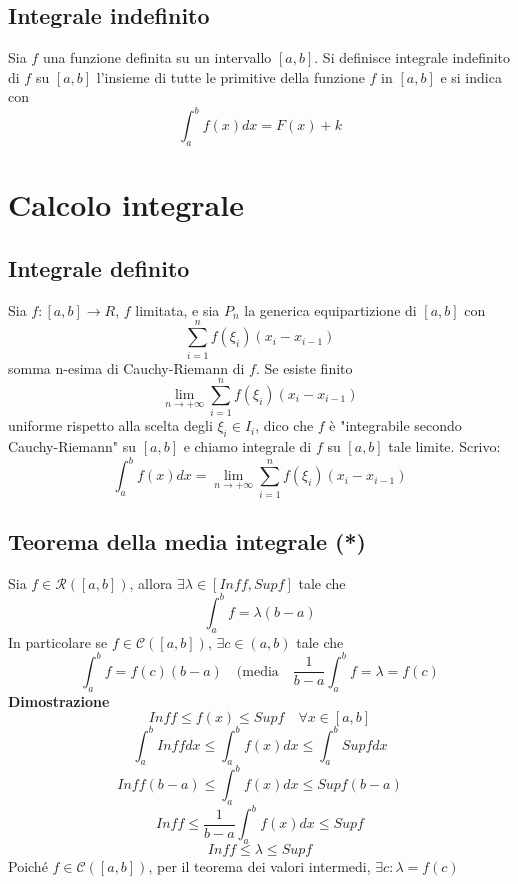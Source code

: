 \documentclass[12pt]{article}
\begin{document}
\subsection{Integrale indefinito}
Sia $f$ una funzione definita su un intervallo $[a,b]$. Si definisce integrale indefinito di $f$ su $[a,b]$ l'insieme di tutte le primitive della funzione $f$ in $[a,b]$ e si indica con 
\[\int_a^b f(x)dx = F(x) + k\]

\section{Calcolo integrale}

\subsection{Integrale definito}
Sia $f:[a,b] \to R$, $f$ limitata, e sia $P_n$ la generica equipartizione di $[a,b]$ con 
\[ \sum_{i = 1}^{n}f(\xi_i)(x_i-x_{i-1})\]
somma n-esima di Cauchy-Riemann di $f$. Se esiste finito \[ \lim_{n \to +\infty} \sum_{i = 1}^{n}f(\xi_i)(x_i-x_{i-1})\]
uniforme rispetto alla scelta degli $\xi_i \in I_i$, dico che $f$ è "integrabile secondo Cauchy-Riemann" su $[a,b]$ e chiamo integrale di $f$ su $[a,b]$ tale limite.\newline
Scrivo: 
\[\displaystyle \int_{a}^{b} f(x)dx = \lim_{n \to +\infty} \sum_{i = 1}^{n}f(\xi_i)(x_i-x_{i-1})\]

\subsection{Teorema della media integrale (*)}
Sia $f \in \mathscr{R}([a,b])$, allora $\exists \lambda \in [Inff, Supf]$ tale che 
\[
\int_{a}^{b}f = \lambda(b-a)\]
In particolare se $f \in \mathscr{C}([a,b])$, $\exists c \in (a,b)$ tale che
\[ \int_{a}^{b} f = f(c)(b-a) \quad ( \text{media} \quad \frac{1}{b-a}\int_{a}^{b} f = \lambda =f(c)\]
\newpage
\textbf{Dimostrazione}
\[Inff \leq f(x) \leq Supf \quad \forall x \in [a,b]\]
\[\int_{a}^{b} Inff dx \leq \int_{a}^{b} f(x) dx \leq \int_{a}^{b} Supf dx\]
\[Inff(b-a) \leq \int_{a}^{b} f(x) dx \leq Supf (b-a)\]
\[Inff \leq \frac{1}{b-a} \int_{a}^{b} f(x) dx \leq Supf\]
\[Inff \leq \lambda \leq Supf\]
Poiché $f \in \mathscr{C}([a,b])$, per il teorema dei valori intermedi, $\exists c: \lambda = f(c)$
\end{document}
